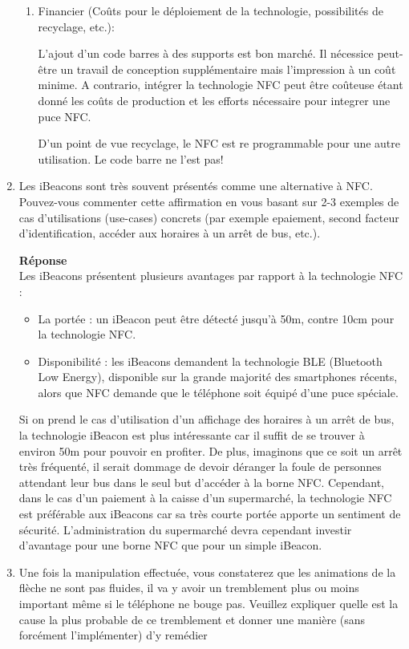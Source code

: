 \documentclass[a4paper]{article}
\begin{document}
\begin{enumerate}
\begin{enumerate}
\item
Financier (Coûts pour le déploiement de la technologie, possibilités de recyclage, etc.):

L'ajout d'un code barres à des supports est bon marché. Il nécessice peut-être un travail de conception supplémentaire mais l'impression à un coût minime.
A contrario, intégrer la technologie NFC peut être coûteuse étant donné les coûts de production et les efforts nécessaire pour integrer une puce NFC.


D'un point de vue recyclage, le NFC est re programmable pour une autre utilisation. Le code barre ne l'est pas!
   \end{enumerate}
    
    \item Les iBeacons sont très souvent présentés comme une alternative à NFC. Pouvez-vous commenter cette affirmation en vous basant sur 2-3 exemples de cas d'utilisations (use-cases) concrets (par exemple epaiement, second facteur d'identification, accéder aux horaires à un arrêt de bus, etc.).
    
    \textbf{Réponse} \\
    Les iBeacons présentent plusieurs avantages par rapport à la technologie NFC :
    \begin{itemize}
    		\item La portée : un iBeacon peut être détecté jusqu'à 50m, contre 10cm pour la technologie NFC.
    		\item Disponibilité : les iBeacons demandent la technologie BLE (Bluetooth Low Energy), disponible sur la grande majorité des smartphones récents, alors que NFC demande que le téléphone soit équipé d'une puce spéciale.
    \end{itemize}
    
    	Si on prend le cas d'utilisation d'un affichage des horaires à un arrêt de bus, la technologie iBeacon est plus intéressante car il suffit de se trouver à environ 50m pour pouvoir en profiter. De plus, imaginons que ce soit un arrêt très fréquenté, il serait dommage de devoir déranger la foule de personnes attendant leur bus dans le seul but d'accéder à la borne NFC. Cependant, dans le cas d'un paiement à la caisse d'un supermarché, la technologie NFC est préférable aux iBeacons car sa très courte portée apporte un sentiment de sécurité. L'administration du supermarché devra cependant investir d'avantage pour une borne NFC que pour un simple iBeacon.
    
    \item Une fois la manipulation effectuée, vous constaterez que les animations de la flèche ne sont pas
    fluides, il va y avoir un tremblement plus ou moins important même si le téléphone ne bouge pas.
    Veuillez expliquer quelle est la cause la plus probable de ce tremblement et donner une manière (sans
    forcément l’implémenter) d’y remédier
    

\end{enumerate}
\end{document}
